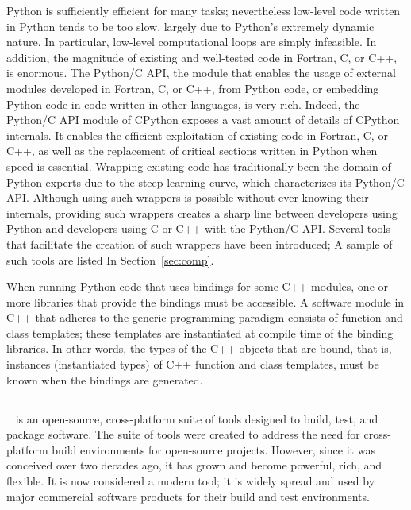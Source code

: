 Python is sufficiently efficient for many tasks; nevertheless
low-level code written in Python tends to be too slow, largely due to
Python's extremely dynamic nature. In particular, low-level
computational loops are simply infeasible. In addition, the magnitude
of existing and well-tested code in Fortran, C, or C++, is
enormous. The Python/C API, the module that enables the usage of
external modules developed in Fortran, C, or C++, from Python code, or
embedding Python code in code written in other languages, is very
rich.  Indeed, the Python/C API module of CPython exposes a vast
amount of details of CPython internals. It enables the efficient
exploitation of existing code in Fortran, C, or C++, as well as the
replacement of critical sections written in Python when speed is
essential. Wrapping existing code has traditionally been the domain of
Python experts due to the steep learning curve, which characterizes
its Python/C API. Although using such wrappers is possible without
ever knowing their internals, providing such wrappers creates a sharp
line between developers using Python and developers using C or C++
with the Python/C API. Several tools that facilitate the creation of
such wrappers have been introduced; A sample of such tools are listed
In Section~\ref{sec:comp}.

When running Python code that uses bindings for some C++ modules, one
or more libraries that provide the bindings must be accessible.  A
software module in C++ that adheres to the generic programming
paradigm consists of function and class templates; these templates are
instantiated at compile time of the binding libraries. In other words,
the types of the C++ objects that are bound, that is, instances
(instantiated types) of C++ function and class templates, must be
known when the bindings are generated.

\subsection{\cmake}
\label{ssec:intro:cmake}
\cmake{}~\cite{mh-mc-08} is an open-source, cross-platform suite of
tools designed to build, test, and package software. The suite of
\cmake{} tools were created to address the need for cross-platform
build environments for open-source projects. However, since it was
conceived over two decades ago, it has grown and become powerful,
rich, and flexible. It is now considered a modern tool; it is widely
spread and used by major commercial software products for their build
and test environments.


